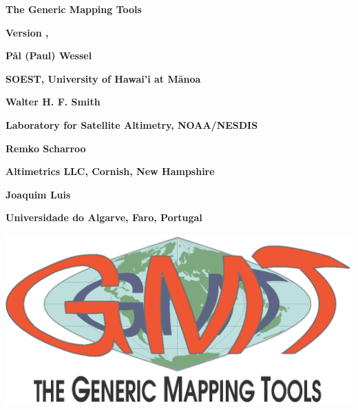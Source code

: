 %
%

\thispagestyle{empty}

\begin{center}
\Huge
\textbf{The Generic Mapping Tools}\par 
\vspace{0.5\baselineskip}
\textbf{\GMTTITLE}\par 

\large
\vspace{0.5\baselineskip}
\textbf{Version \GMTDOCVERSION, \GMTDOCDATE}\par 
\vspace{0.25\baselineskip}

\vspace{2.0\baselineskip}

\huge
\textbf{P\aa l (Paul) Wessel}\par 
\vspace{0.5\baselineskip}

\Large
\textbf{SOEST, University of Hawai'i at M\={a}noa}\par 
\vspace{0.5\baselineskip}

\huge
\textbf{Walter H. F. Smith}\par 
\vspace{0.5\baselineskip}

\Large
\textbf{Laboratory for Satellite Altimetry, NOAA/NESDIS}\par 
\vspace{0.5\baselineskip}

\huge
\textbf{Remko Scharroo}\par 
\vspace{0.5\baselineskip}

\Large
\textbf{Altimetrics LLC, Cornish, New Hampshire}\par 
\vspace{0.5\baselineskip}

\huge
\textbf{Joaquim Luis}\par 
\vspace{0.5\baselineskip}

\Large
\textbf{Universidade do Algarve, Faro, Portugal}\par 
\vspace{0.5\baselineskip}


\includegraphics{scripts/GMT_coverlogo}
\end{center}
